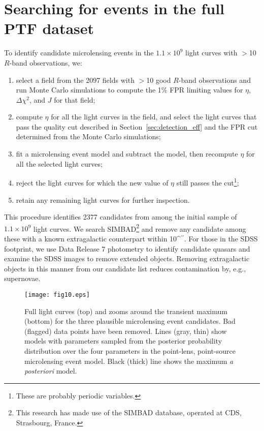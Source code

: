 \documentclass{emulateapj}
\def\asec{\ifmmode^{\prime\prime}\else$^{\prime\prime}$\fi}
\begin{document}
\section{Searching for events in the full PTF dataset}\label{sec:search}
To identify candidate microlensing events in the $1.1\times10^9$ light curves with $>$10 $R$-band observations, we:
\begin{enumerate}
	\item select a field from the 2097 fields with $>$10 good $R$-band observations and run Monte Carlo simulations to compute the 1\% FPR limiting values for $\eta$, $\Delta \chi^2$, and $J$ for that field;
	\item compute $\eta$ for all the light curves in the field, and select the light curves that pass the quality cut described in Section~\ref{sec:detection_eff} and the FPR cut determined from the Monte Carlo simulations;
	\item fit a microlensing event model and subtract the model, then recompute $\eta$ for all the selected light curves;
	\item reject the light curves for which the new value of $\eta$ still passes the cut\footnote{These are probably periodic variables.};
	\item retain any remaining light curves for further inspection.
\end{enumerate}

This procedure identifies 2377 candidates from among the initial sample of $1.1\times10^9$ light curves. We search SIMBAD\footnote{This research has made use of the SIMBAD database, operated at CDS, Strasbourg, France.} and remove any candidate among these with a known extragalactic counterpart within 10\asec. For those in the SDSS footprint, we use Data Release 7 photometry \citep{DR7paper} to identify candidate quasars \citep[using the cuts described in][]{richards02} and examine the SDSS images \citep{sdss_images} to remove extended objects. Removing extragalactic objects in this manner from our candidate list reduces contamination by, e.g., supernovae. 

\begin{figure*}[htb]
\centering
\texttt{[image: fig10.eps]}
\caption{Full light curves (top) and zooms around the transient maximum (bottom) for the three plausible microlensing event candidates. Bad (flagged) data points have been removed. Lines (gray, thin) show models with parameters sampled from the posterior probability distribution over the four parameters in the point-lens, point-source microlensing event model. Black (thick) line shows the maximum {\it a posteriori} model. }\label{fig:candidates}
\end{figure*}
\end{document}
